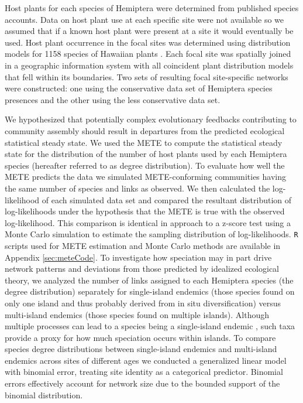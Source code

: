 Host plants for each species of Hemiptera were determined from
published species accounts. Data on host plant use at each specific
site were not available so we assumed that if a known host plant were
present at a site it would eventually be used. Host plant occurrence
in the focal sites was determined using distribution models for 1158
species of Hawaiian plants \citep{price2012}. Each focal site was
spatially joined in a geographic information system with all
coincident plant distribution models that fell within its
boundaries. Two sets of resulting focal site-specific networks were
constructed: one using the conservative data set of Hemiptera species
presences and the other using the less conservative data set.

We hypothesized that potentially complex evolutionary feedbacks
contributing to community assembly should result in departures from
the predicted ecological statistical steady state. We used the METE
\citep{williams2010, harte2011} to compute the statistical steady
state for the distribution of the number of host plants used by each
Hemiptera species (hereafter referred to as degree distribution). To
evaluate how well the METE predicts the data we simulated
METE-conforming communities having the same number of species and
links as observed. We then calculated the log-likelihood of each
simulated data set and compared the resultant distribution of
log-likelihoods under the hypothesis that the METE is true with the
observed log-likelihood. This comparison is identical in approach to a
z-score test using a Monte Carlo simulation to estimate the sampling
distribution of log-likelihoods. \texttt{R} scripts
\citep[v.3.1.1;][]{RCore} used for METE estimation and Monte Carlo
methods are available in Appendix \ref{sec:meteCode}.  To investigate
how speciation may in part drive network patterns and deviations from
those predicted by idealized ecological theory, we analyzed the number
of links assigned to each Hemiptera species (the degree distribution)
separately for single-island endemics (those species found on only one
island and thus probably derived from in situ diversification) versus
multi-island endemics (those species found on multiple
islands). Although multiple processes can lead to a species being a
single-island endemic \citep{whittaker2008}, such taxa provide a proxy
for how much speciation occurs within islands. To compare species
degree distributions between single-island endemics and multi-island
endemics across sites of different ages we conducted a generalized
linear model with binomial error, treating site identity as a
categorical predictor. Binomial errors effectively account for network
size due to the bounded support of the binomial distribution.

